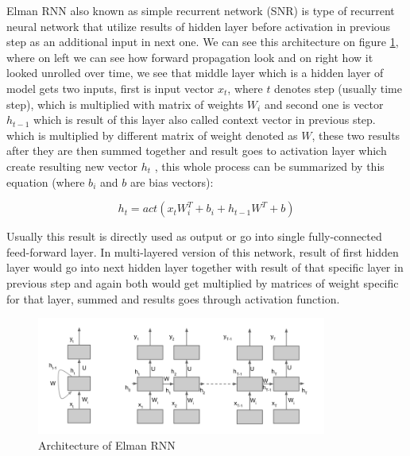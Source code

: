 Elman RNN also known as simple recurrent network (SNR) is type of recurrent neural network that utilize results of hidden layer before activation in previous step as an additional input in next one. We can see this architecture on figure \ref{fig:elman_arch}, where on left we can see how forward propagation look and on right how it looked unrolled over time, we see that middle layer which is a hidden layer of model gets two inputs, first is input vector $x_t$, where $t$ denotes step (usually time step), which is multiplied with matrix of weights $W_i$ and second one is vector $h_{t-1}$ which is result of this layer also called context vector in previous step. which is multiplied by different matrix of weight denoted as $W$, these two results after they are then summed together and result goes to activation layer which create resulting new vector $h_t$ \cite{elman}, this whole process can be summarized by this equation (where $b_i$ and $b$ are bias vectors):

\begin{equation}
	\label{eqn:elman}
	h_t = act(x_t W^T_i + b_i + h_{t-1} W^T + b)
\end{equation} 

Usually this result is directly used as output or go into single fully-connected feed-forward layer. In multi-layered version of this network, result of first hidden layer would go into next hidden layer together with result of that specific layer in previous step and again both would get multiplied by matrices of weight specific for that layer, summed and results goes through activation function.
\\

\begin{figure}[!h]
	\centering
	
	\includegraphics[width=0.85\textwidth]{images/Elman_RNN_architecture.png}
	
	\caption{Architecture of Elman RNN \cite{elman_img}}
	\label{fig:elman_arch}
\end{figure}

  

